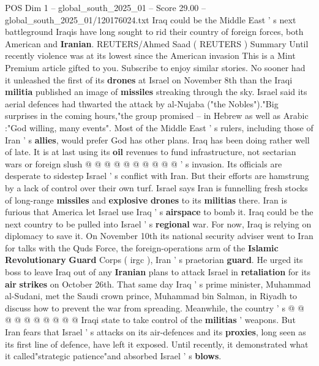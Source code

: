 \begin{textsample}{POS Dim 1 – global\_south\_2025\_01 – Score 29.00 – global\_south\_2025\_01/120176024.txt}  \label{ex:f1_pos_301}
Iraq could be the Middle East ' s next battleground Iraqis have long sought to rid their country of foreign forces, both American and \textbf{Iranian}.
REUTERS/Ahmed Saad ( REUTERS ) Summary Until recently violence was at its lowest since the American invasion This is a Mint Premium article gifted to you.
Subscribe to enjoy similar stories.
No sooner had it unleashed the first of its \textbf{drones} at Israel on November 8th than the Iraqi \textbf{militia} published an image of \textbf{missiles} streaking through the sky.
Israel said its aerial defences had thwarted the attack by al-Nujaba ("the Nobles")."Big surprises in the coming hours,"the group promised -- in Hebrew as well as Arabic :"God willing, many events".
Most of the Middle East ' s rulers, including those of Iran ' s \textbf{allies}, would prefer God has other plans.
Iraq has been doing rather well of late.
It is at last using its \textbf{oil} revenues to fund infrastructure, not sectarian wars or foreign slush @ @ @ @ @ @ @ @ @ @ ' s invasion.
Its officials are desperate to sidestep Israel ' s conflict with Iran.
But their efforts are hamstrung by a lack of control over their own turf.
Israel says Iran is funnelling fresh stocks of long-range \textbf{missiles} and \textbf{explosive} \textbf{drones} to its \textbf{militias} there.
Iran is furious that America let Israel use Iraq ' s \textbf{airspace} to bomb it.
Iraq could be the next country to be pulled into Israel ' s \textbf{regional} war.
For now, Iraq is relying on diplomacy to save it.
On November 10th its national security adviser went to Iran for talks with the Quds Force, the foreign-operations arm of the \textbf{Islamic} \textbf{Revolutionary} \textbf{Guard} Corps ( irgc ), Iran ' s praetorian \textbf{guard}.
He urged its boss to leave Iraq out of any \textbf{Iranian} plans to attack Israel in \textbf{retaliation} for its \textbf{air} \textbf{strikes} on October 26th.
That same day Iraq ' s prime minister, Muhammad al-Sudani, met the Saudi crown prince, Muhammad bin Salman, in Riyadh to discuss how to prevent the war from spreading.
Meanwhile, the country ' s @ @ @ @ @ @ @ @ @ @ Iraqi state to take control of the \textbf{militias} ' weapons.
But Iran fears that Israel ' s attacks on its air-defences and its \textbf{proxies}, long seen as its first line of defence, have left it exposed.
Until recently, it demonstrated what it called"strategic patience"and absorbed Israel ' s \textbf{blows}.

\end{textsample}

